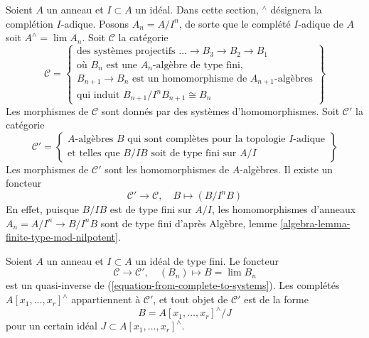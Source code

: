 \noindent
Soient $A$ un anneau et $I \subset A$ un idéal.
Dans cette section, ${}^\wedge$ désignera la complétion $I$-adique.
Posons $A_n = A/I^n$, de sorte que le complété $I$-adique de $A$ soit
$A^\wedge = \lim A_n$. Soit $\mathcal{C}$ la catégorie
\begin{equation}
\label{equation-C}
\mathcal{C} =
\left\{
\begin{matrix}
\text{des systèmes projectifs }\ldots \to B_3 \to B_2 \to B_1 \\
\text{où }B_n\text{ est une }A_n\text{-algèbre de type fini,}\\
B_{n + 1} \to B_n\text{ est un homomorphisme de }A_{n + 1}\text{-algèbres}\\
\text{qui induit }B_{n + 1}/I^nB_{n + 1} \cong B_n
\end{matrix}
\right\}
\end{equation}
Les morphismes de $\mathcal{C}$ sont donnés par des systèmes
d'homomorphismes. Soit $\mathcal{C}'$ la catégorie
\begin{equation}
\label{equation-C-prime}
\mathcal{C}' =
\left\{
\begin{matrix}
A\text{-algèbres }B\text{ qui sont complètes pour la topologie }I\text{-adique}\\
\text{et telles que }B/IB\text{ soit de type fini sur }A/I
\end{matrix}
\right\}
\end{equation}
Les morphismes de $\mathcal{C}'$ sont les homomorphismes de $A$-algèbres.
Il existe un foncteur
\begin{equation}
\label{equation-from-complete-to-systems}
\mathcal{C}' \longrightarrow \mathcal{C},\quad
B \longmapsto (B/I^nB)
\end{equation}
En effet, puisque $B/IB$ est de type fini sur $A/I$, les homomorphismes
d'anneaux $A_n = A/I^n \to B/I^nB$ sont de type fini d'après
Algèbre, lemme \ref{algebra-lemma-finite-type-mod-nilpotent}.

\begin{lemma}
\label{lemma-topologically-finite-type}
Soient $A$ un anneau et $I \subset A$ un idéal de type fini. Le foncteur
$$
\mathcal{C} \longrightarrow \mathcal{C}',\quad
(B_n) \longmapsto B = \lim B_n
$$
est un quasi-inverse de (\ref{equation-from-complete-to-systems}).
Les complétés $A[x_1, \ldots, x_r]^\wedge$ appartiennent à
$\mathcal{C}'$, et tout objet de $\mathcal{C}'$ est de la forme
$$
B = A[x_1, \ldots, x_r]^\wedge / J
$$
pour un certain idéal $J \subset A[x_1, \ldots, x_r]^\wedge$.
\end{lemma}

